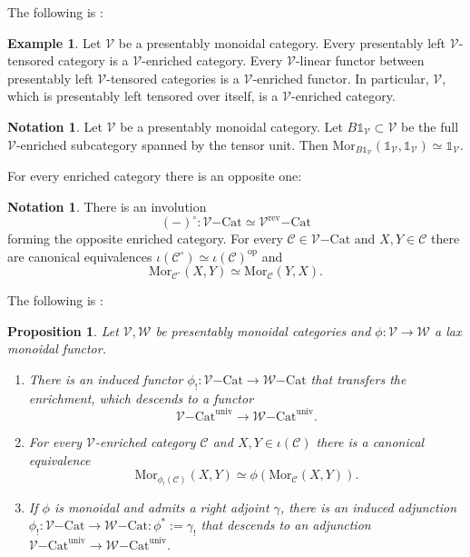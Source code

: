\documentclass[10pt,oneside]{article}
\numberwithin{equation}{section} %
\numberwithin{figure}{section} %
\theoremstyle{plain}
\newtheorem{proposition}[theorem]{Proposition}
\theoremstyle{definition}
\newtheorem{notation}[theorem]{Notation}
\newtheorem{example}[theorem]{Example}
\newcommand{\mC}{{\mathcal C}}
\newcommand{\mV}{{\mathcal V}}
\newcommand{\mW}{{\mathcal W}}
\newcommand{\op}{\mathrm{op}}
\newcommand{\rev}{{\mathrm{rev}}}
\newcommand{\univ}{\mathrm{univ}}
\newcommand{\Cat}{\mathrm{Cat}}
\newcommand{\tu}{{\mathbb 1}}
\newcommand{\Mor}{{\mathrm{Mor}}}
\begin{document}
The following is \cite[Example 2.134.]{heine2024bienriched}:

\begin{example}\label{linenr}
Let $\mV$ be a presentably monoidal category. Every presentably left $\mV$-tensored category is a $\mV$-enriched category.
Every $\mV$-linear functor between presentably left $\mV$-tensored categories is a $\mV$-enriched functor.
In particular, $\mV$, which is presentably left tensored over itself, is a $\mV$-enriched category.

\end{example}

\begin{notation}Let $\mV$ be a presentably monoidal category.
Let $B\tu_\mV \subset \mV$ be the full $\mV$-enriched subcategory spanned by the tensor unit. Then $\Mor_{B\tu_\mV}(\tu_\mV, \tu_\mV) \simeq \tu_\mV.$
    
\end{notation}

For every enriched category there is an opposite one:

\begin{notation}
There is an involution $$(-)^\circ: {\mV\mathrm{-}\Cat} \simeq {\mV^\rev\mathrm{-}\Cat}$$ forming the opposite enriched category.
For every $\mC \in {\mV\mathrm{-}\Cat}$ and $X,Y \in \mC$
there are canonical equivalences
$ \iota(\mC^\circ) \simeq \iota(\mC)^\op$
and $$ \Mor_{\mC^\circ}(X,Y) \simeq \Mor_{\mC}(Y,X).$$
\end{notation}

The following is \cite[Proposition 3.72.]{heine2024bienriched}:

\begin{proposition}

Let $\mV,\mW$ be presentably monoidal categories and 
$\phi:\mV \to \mW$ a lax monoidal functor.

\begin{enumerate}[\normalfont(1)]\setlength{\itemsep}{-2pt}
\item There is an induced functor
$\phi_!: \mV \mathrm{-}\Cat \to \mW \mathrm{-}\Cat$
that transfers the enrichment, which descends to a functor
$$\mV \mathrm{-}\Cat^\univ \to \mW \mathrm{-}\Cat^\univ.$$

\item For every $\mV$-enriched category $\mC$ and $X,Y \in \iota(\mC)$
there is a canonical equivalence
$$ \Mor_{\phi_!(\mC)}(X,Y) \simeq \phi(\Mor_\mC(X,Y)).$$

\item If $\phi$ is monoidal and admits a right adjoint $\gamma$,
there is an induced adjunction
$\phi_!: \mV \mathrm{-}\Cat \to \mW \mathrm{-}\Cat: \phi^*:=\gamma_!$
that descends to an adjunction 
$\mV \mathrm{-}\Cat^\univ \to \mW \mathrm{-}\Cat^\univ.$

\end{enumerate}

\end{proposition}
\end{document}
